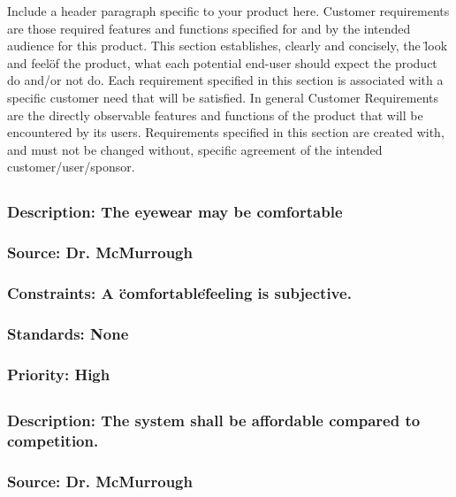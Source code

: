 Include a header paragraph specific to your product here. Customer requirements are those required features and functions specified for and by the intended audience for this product. This section establishes, clearly and concisely, the \"look and feel\" of the product, what each potential end-user should expect the product do and/or not do. Each requirement specified in this section is associated with a specific customer need that will be satisfied. In general Customer Requirements are the directly observable features and functions of the product that will be encountered by its users. Requirements specified in this section are created with, and must not be changed without, specific agreement of the intended customer/user/sponsor.

\subsection{\bfFeeling}
\subsubsection{Description: The eyewear may be comfortable}
\subsubsection{Source: Dr. McMurrough}
\subsubsection{Constraints: A \"comfortable\" feeling is subjective.}
\subsubsection{Standards: None}
\subsubsection{Priority: High}

\subsection{\bfPricing}
\subsubsection{Description: The system shall be affordable compared to competition.}
\subsubsection{Source: Dr. McMurrough}

